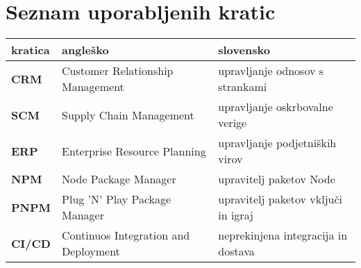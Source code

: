 \chapter*{Seznam uporabljenih kratic}

\begin{tabular}{l|l|l}
  {\bf kratica} & {\bf angleško} & {\bf slovensko} \\ \hline
  {\bf CRM} & Customer Relationship Management & upravljanje odnosov s strankami \\
  {\bf SCM} & Supply Chain Management & upravljanje oskrbovalne verige \\
  {\bf ERP} & Enterprise Resource Planning & upravljanje podjetniških virov \\
  {\bf NPM} & Node Package Manager & upravitelj paketov Node \\
  {\bf PNPM} & Plug 'N' Play Package Manager & upravitelj paketov vključi in igraj \\
  {\bf CI/CD} & Continuos Integration and Deployment & neprekinjena integracija in dostava \\
  
\end{tabular}